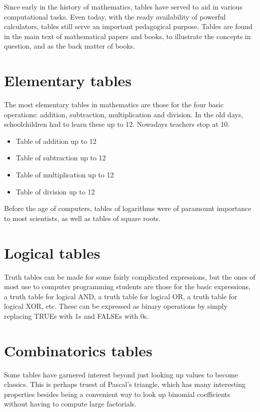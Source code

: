 \documentclass[12pt]{article}
\begin{document}
Since early in the history of mathematics, tables have served to aid in various computational tasks. Even today, with the ready availability of powerful calculators, tables still serve an important pedagogical purpose. Tables are found in the main text of mathematical papers and books, to illustrate the concepts in question, and as the back matter of books.

\section{Elementary tables}

The most elementary tables in mathematics are those for the four basic operations: addition, subtraction, multiplication and division. In the old days, schoolchildren had to learn these up to 12. Nowadays teachers stop at 10.

\begin{itemize}
\item Table of addition up to 12
\item Table of subtraction up to 12
\item Table of multiplication up to 12
\item Table of division up to 12
\end{itemize}

Before the age of computers, tables of logarithms were of paramount importance to most scientists, as well as tables of square roots.

\section{Logical tables}

Truth tables can be made for some fairly complicated expressions, but the ones of most use to computer programming students are those for the basic expressions, a truth table for logical AND, a truth table for logical OR, a truth table for logical XOR, etc. These can be expressed as binary operations by simply replacing TRUEs with 1s and FALSEs with 0s.

\section{Combinatorics tables}

Some tables have garnered interest beyond just looking up values to become classics. This is perhaps truest of Pascal's triangle, which has many interesting properties besides being a convenient way to look up binomial coefficients without having to compute large factorials.
\end{document}
